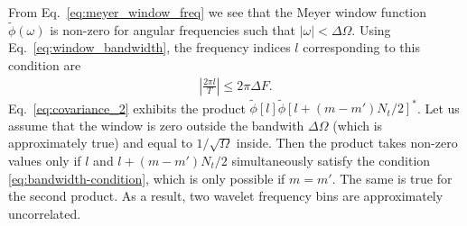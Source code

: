 \documentclass{article}
\begin{document}
From Eq.~\eqref{eq:meyer_window_freq} we see that the Meyer window function $\tilde\phi(\omega)$ is non-zero for angular frequencies such that $|\omega| < \Delta \Omega $. Using Eq.~\eqref{eq:window_bandwidth}, the frequency indices $l$ corresponding to this condition are
\begin{align}
\label{eq:bandwidth-condition}
    \left| \frac{2 \pi l}{T} \right| \leq 2 \pi \Delta F.
\end{align}
Eq.~\eqref{eq:covariance_2} exhibits the product $\tilde{\phi}[l] \tilde{\phi}[l + (m-m') N_t / 2]^{\ast}$. Let us assume that the window is zero outside the bandwith $\Delta \Omega$ (which is approximately true) and equal to $1/\sqrt{\Omega}$ inside. Then the product takes non-zero values only if $l$ and $l + (m-m') N_t / 2$ simultaneously satisfy the condition \eqref{eq:bandwidth-condition}, which is only possible if $m=m'$. The same is true for the second product. As a result, two wavelet frequency bins are approximately uncorrelated.
\end{document}
